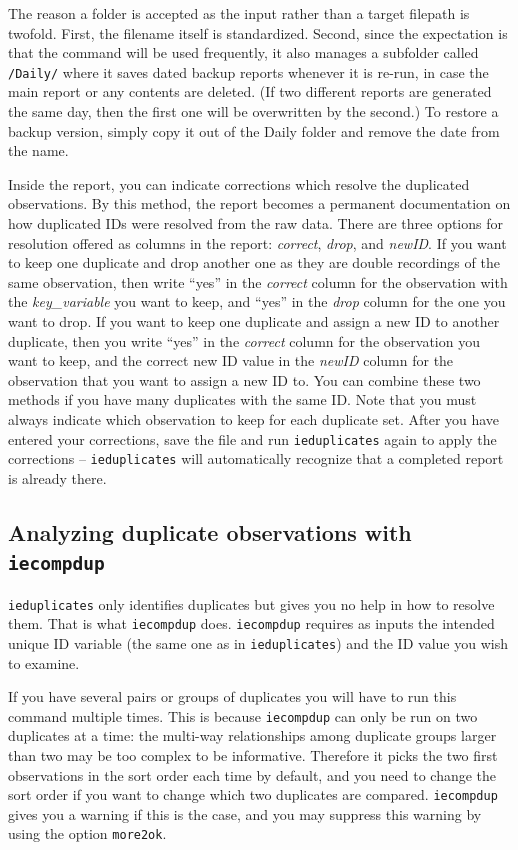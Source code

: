 \documentclass{tufte-handout}
\begin{document}
The reason a folder is accepted as the input rather than a target filepath is twofold.
First, the filename itself is standardized.
Second, since the expectation is that the command will be used frequently,
it also manages a subfolder called \texttt{/Daily/} where it saves
dated backup reports whenever it is re-run, in case the main report or any contents are deleted.
(If two different reports are generated the same day,
then the first one will be overwritten by the second.)
To restore a backup version, simply copy it out of the Daily folder
and remove the date from the name.

Inside the report, you can indicate corrections which resolve the duplicated observations.
By this method, the report becomes a permanent documentation on how
duplicated IDs were resolved from the raw data.
There are three options for resolution offered as columns in the report:
\textit{correct}, \textit{drop}, and \textit{newID}.
If you want to keep one duplicate and drop another one as they are double recordings
of the same observation, then write ``yes'' in the \textit{correct} column
for the observation with the {\it key\_variable} you want to keep,
and ``yes'' in the \textit{drop} column for the one you want to drop.
If you want to keep one duplicate and assign a new ID to another duplicate,
then you write ``yes'' in the \textit{correct} column for the observation you want to keep,
and the correct new ID value in the \textit{newID} column for the observation
that you want to assign a new ID to. You can combine these two methods
if you have many duplicates with the same ID. Note that you must
always indicate which observation to keep for each duplicate set.
After you have entered your corrections, save the file and run
\texttt{ieduplicates} again to apply the corrections --
\texttt{ieduplicates} will automatically recognize that a completed report is already there.

\subsection{Analyzing duplicate observations with \texttt{iecompdup}}

\texttt{ieduplicates} only identifies duplicates but gives you no help in how to resolve them.
That is what \texttt{iecompdup} does. \texttt{iecompdup} requires as inputs the intended unique ID variable
(the same one as in \texttt{ieduplicates}) and the ID value you wish to examine.

If you have several pairs or groups of duplicates you will have to run this command multiple times.
This is because \texttt{iecompdup} can only be run on two duplicates at a time:
the multi-way relationships among duplicate groups larger than two may be too complex to be informative.
Therefore it picks the two first observations in the sort order each time by default,
and you need to change the sort order if you want to change which two duplicates are compared.
\texttt{iecompdup} gives you a warning if this is the case,
and you may suppress this warning by using the option \texttt{more2ok}.
\end{document}
